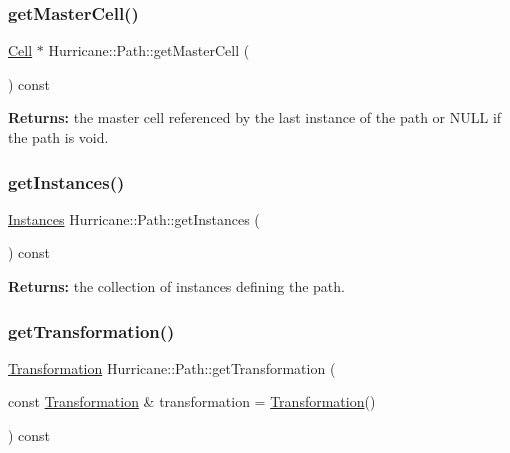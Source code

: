 \subsubsection{\texorpdfstring{get\+Master\+Cell()}{getMasterCell()}}
{\footnotesize\ttfamily \hyperlink{classHurricane_1_1Cell}{Cell} $\ast$ Hurricane\+::\+Path\+::get\+Master\+Cell (\begin{DoxyParamCaption}{ }\end{DoxyParamCaption}) const}

{\bfseries Returns\+:} the master cell referenced by the last instance of the path or N\+U\+LL if the path is void. \mbox{\label{classHurricane_1_1Path_af820422a686ab35d611a6c1969e37e90}} 
\subsubsection{\texorpdfstring{get\+Instances()}{getInstances()}}
{\footnotesize\ttfamily \hyperlink{namespaceHurricane_ac9436b03a2926f34ad6863deae2baadc}{Instances} Hurricane\+::\+Path\+::get\+Instances (\begin{DoxyParamCaption}{ }\end{DoxyParamCaption}) const}

{\bfseries Returns\+:} the collection of instances defining the path. \mbox{\label{classHurricane_1_1Path_af48dc47810f65e7aba6ee8f24ed8a09e}} 
\subsubsection{\texorpdfstring{get\+Transformation()}{getTransformation()}}
{\footnotesize\ttfamily \hyperlink{classHurricane_1_1Transformation}{Transformation} Hurricane\+::\+Path\+::get\+Transformation (\begin{DoxyParamCaption}\item[{const \hyperlink{classHurricane_1_1Transformation}{Transformation} \&}]{transformation = {\ttfamily \hyperlink{classHurricane_1_1Transformation}{Transformation}()} }\end{DoxyParamCaption}) const}


